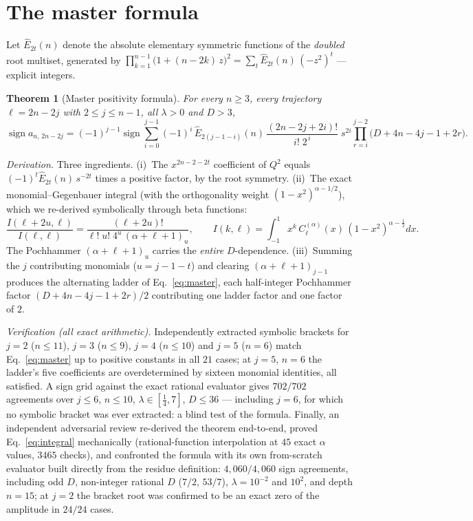 \documentclass[11pt]{article}
\newtheorem{theorem}{Theorem}
\begin{document}
\section{The master formula}

Let $\widehat E_{2t}(n)$ denote the absolute elementary symmetric functions
of the \emph{doubled} root multiset, generated by
$\prod_{k=1}^{n-1}\bigl(1+(n-2k)\,z\bigr)^2=\sum_t \widehat
E_{2t}(n)\,(-z^2)^t\!$ --- explicit integers.

\begin{theorem}[Master positivity formula]\label{thm:master}
For every $n\ge3$, every trajectory $\ell=2n-2j$ with $2\le j\le n-1$, all
$\lambda>0$ and $D>3$,
\begin{equation}\label{eq:master}
\operatorname{sign} a_{n,\,2n-2j}
=(-1)^{j-1}\operatorname{sign}
\sum_{i=0}^{j-1}(-1)^i\,
\widehat E_{2(j-1-i)}(n)\,
\frac{(2n-2j+2i)!}{i!\;2^{\,i}}\;
s^{2i}
\prod_{r=i}^{j-2}\bigl(D+4n-4j-1+2r\bigr).
\end{equation}
\end{theorem}

\emph{Derivation.} Three ingredients. (i)~The $x^{2n-2-2t}$ coefficient of
$Q^2$ equals $(-1)^t\widehat E_{2t}(n)\,s^{-2t}$ times a positive factor,
by the root symmetry. (ii)~The exact monomial--Gegenbauer integral (with the
orthogonality weight $(1-x^2)^{\alpha-1/2}$), which we re-derived
symbolically through beta functions:
\begin{equation}\label{eq:integral}
\frac{I(\ell+2u,\ell)}{I(\ell,\ell)}
=\frac{(\ell+2u)!}{\ell!\;u!\;4^u\,(\alpha+\ell+1)_u},
\qquad
I(k,\ell)=\int_{-1}^{1}x^k\,C^{(\alpha)}_\ell(x)\,(1-x^2)^{\alpha-\frac12}dx .
\end{equation}
The Pochhammer $(\alpha+\ell+1)_u$ carries the \emph{entire} $D$-dependence.
(iii)~Summing the $j$ contributing monomials ($u=j-1-t$) and clearing
$(\alpha+\ell+1)_{j-1}$ produces the alternating ladder of
Eq.~\eqref{eq:master}, each half-integer Pochhammer factor
$(D+4n-4j-1+2r)/2$ contributing one ladder factor and one factor of $2$.

\emph{Verification (all exact arithmetic).} Independently extracted symbolic
brackets for $j=2$ ($n\le11$), $j=3$ ($n\le9$), $j=4$ ($n\le10$) and $j=5$
($n=6$) match Eq.~\eqref{eq:master} up to positive constants in all $21$
cases; at $j{=}5$, $n{=}6$ the ladder's five coefficients are overdetermined
by sixteen monomial identities, all satisfied. A sign grid against the exact
rational evaluator gives $702/702$ agreements over $j\le6$, $n\le10$,
$\lambda\in[\tfrac14,7]$, $D\le36$ --- including $j{=}6$, for which no
symbolic bracket was ever extracted: a blind test of the formula. Finally, an independent adversarial
review re-derived the theorem end-to-end, proved
Eq.~\eqref{eq:integral} mechanically (rational-function interpolation at
$45$ exact $\alpha$ values, $3465$ checks), and confronted the formula with
its own from-scratch evaluator built directly from the residue definition:
$4{,}060/4{,}060$ sign agreements, including odd $D$, non-integer rational
$D$ ($7/2$, $53/7$), $\lambda=10^{-2}$ and $10^{2}$, and depth $n=15$; at
$j{=}2$ the bracket root was confirmed to be an exact zero of the amplitude
in $24/24$ cases.
\end{document}
